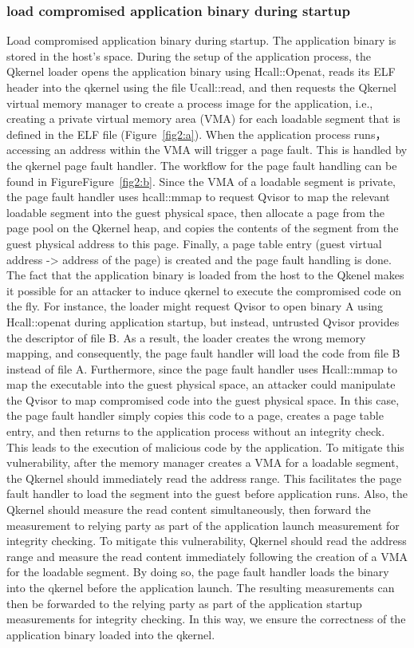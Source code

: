 \subsubsection{load compromised application binary during startup}
\label{sec:app_binary_loading}
Load compromised application binary during startup. The application binary is stored in the host's space. During the setup of the application process, the Qkernel loader opens the application binary using Hcall::Openat, reads its ELF header 
into the qkernel using the file Ucall::read, and then requests the Qkernel virtual memory manager to create a process image for the application, i.e., creating a private virtual memory area (VMA) for each loadable segment that is defined in the 
ELF file (Figure~\ref{fig2:a}). When the application process runs， accessing an address within the VMA will trigger a page fault. This is handled by the qkernel page fault handler. The workflow for the page fault handling can be found in FigureFigure~\ref{fig2:b}. Since the VMA of 
a loadable segment is private, the page fault handler uses hcall::mmap to request Qvisor to map the relevant loadable segment into the guest physical space, then allocate a page from the page pool on the Qkernel heap, and copies the contents of 
the segment from the guest physical address to this page. Finally, a page table entry (guest virtual address -> address of the page) is created and the page fault handling is done. The fact that the application binary is loaded from the host to 
the Qkenel makes it possible for an attacker to induce qkernel to execute the compromised code on the fly. For instance, the loader might request Qvisor to open binary A using Hcall::openat during application startup, but instead, untrusted Qvisor 
provides the descriptor of file B. As a result, the loader creates the wrong memory mapping, and consequently, the page fault handler will load the code from file B instead of file A. Furthermore, since the page fault handler uses Hcall::mmap to 
map the executable into the guest physical space, an attacker could manipulate the Qvisor to map compromised code into the guest physical space. In this case, the page fault handler simply copies this code to a page, creates a page table entry, 
and then returns to the application process without an integrity check. This leads to the execution of malicious code by the application. To mitigate this vulnerability, after the memory manager creates a VMA for a loadable segment, the Qkernel 
should immediately read the address range. This facilitates the page fault handler to load the segment into the guest before application runs. Also, the Qkernel should measure the read content simultaneously, then forward the measurement to relying 
party as part of the application launch measurement for integrity checking. To mitigate this vulnerability, Qkernel should read the address range and measure the read content immediately following the creation of a VMA for the loadable segment. 
By doing so, the page fault handler loads the binary into the qkernel before the application launch. The resulting measurements can then be forwarded to the relying party as part of the application startup measurements for integrity checking. 
In this way, we ensure the correctness of the application binary loaded into the qkernel.

